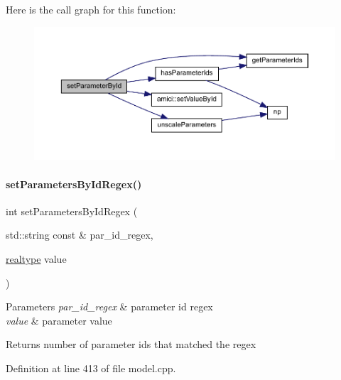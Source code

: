Here is the call graph for this function\+:
\nopagebreak
\begin{figure}[H]
\begin{center}
\leavevmode
\includegraphics[width=350pt]{classamici_1_1_model_a995357a19663980279249d4b89a88f7a_cgraph}
\end{center}
\end{figure}
\mbox{\label{classamici_1_1_model_ab66d6b754637ed68449af96f5887a0be}} 
\paragraph{\texorpdfstring{set\+Parameters\+By\+Id\+Regex()}{setParametersByIdRegex()}}
{\footnotesize\ttfamily int set\+Parameters\+By\+Id\+Regex (\begin{DoxyParamCaption}\item[{std\+::string const \&}]{par\+\_\+id\+\_\+regex,  }\item[{\mbox{\hyperlink{namespaceamici_a1bdce28051d6a53868f7ccbf5f2c14a3}{realtype}}}]{value }\end{DoxyParamCaption})}


\begin{DoxyParams}{Parameters}
{\em par\+\_\+id\+\_\+regex} & parameter id regex \\
\hline
{\em value} & parameter value \\
\hline
\end{DoxyParams}
\begin{DoxyReturn}{Returns}
number of parameter ids that matched the regex 
\end{DoxyReturn}


Definition at line 413 of file model.\+cpp.

